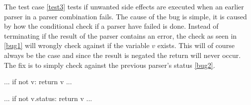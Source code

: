 The test case \ref{test3} tests if unwanted side effects are executed when an earlier parser in a parser combination fails.
The cause of the bug is simple, it is caused by how the conditional check if a parser have failed is done.
Instead of terminating if the result of the parser contains an error, the check as seen in \ref{bug1} will wrongly check against if the variable $v$ exists.
This will of course always be the case and since the result is negated the return will never occur. The fix is to simply check against the previous parser's status \ref{bug2}.


\renewcommand{\lstlistingname}{Code}

\begin{python}[caption={Fault in the source code.}, label=bug1]
    ...
    if not v:
        return v
    ...
\end{python}


\begin{python}[caption={The fix to the bug showcased in \ref{bug1}.}, label=bug2]
    ...
    if not v.status:
        return v
    ...
\end{python}





